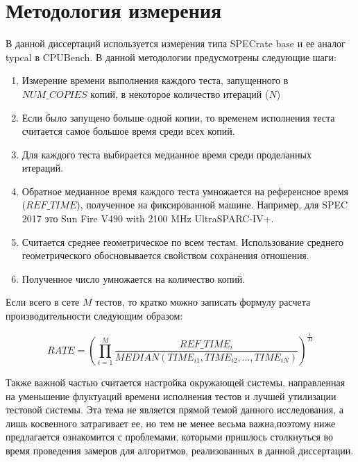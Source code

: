 \section{Методология измерения}\label{p1:method}
В данной диссертаций используется измерения типа  SPECrate base и ее аналог typcal в CPUBench. В данной методологии предусмотрены следующие шаги:
\begin{enumerate} 
		\item Измерение времени выполнения каждого теста, запущенного в $NUM\_COPIES$ копий, в некоторое количество итераций ($N$)
		\item Если было запущено больше одной копии, то временем исполнения теста считается самое большое время среди всех копий.
		\item Для каждого теста выбирается медианное время среди проделанных итераций. 
		\item Обратное медианное время каждого теста умножается на референсное время ($REF\_TIME$), полученное на фиксированной машине. Например, для SPEC 2017  это  Sun Fire V490 with 2100 MHz UltraSPARC-IV+.
		\item Считается среднее геометрическое по всем тестам. Использование среднего геометрического обосновывается свойством сохранения отношения.
		\item Полученное число умножается на количество копий.
\end{enumerate}
Если всего в сете $M$ тестов, то кратко можно записать формулу расчета производительности следующим образом:

$$RATE =\left(\prod _{i=1}^{M}\dfrac{REF\_TIME_i}{MEDIAN(TIME_{i1}, TIME_{i2}, ... , TIME_{iN})}\right)^{\frac {1}{M}} $$

Также важной частью считается настройка окружающей системы, направленная на уменьшение флуктуаций времени исполнения тестов и лучшей утилизации тестовой системы.
Эта тема не является прямой темой данного исследования, а лишь косвенного затрагивает ее, но тем не менее весьма важна,поэтому ниже предлагается ознакомится с проблемами, которыми пришлось столкнуться во  время проведения замеров для алгоритмов, реализованных в данной диссертации.  

